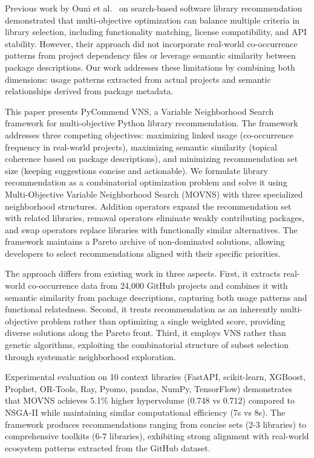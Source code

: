\documentclass[runningheads]{llncs}
\begin{document}
Previous work by Ouni et al.~\cite{ouni2017} on search-based software library recommendation demonstrated that multi-objective optimization can balance multiple criteria in library selection, including functionality matching, license compatibility, and API stability. However, their approach did not incorporate real-world co-occurrence patterns from project dependency files or leverage semantic similarity between package descriptions. Our work addresses these limitations by combining both dimensions: usage patterns extracted from actual projects and semantic relationships derived from package metadata.

This paper presents PyCommend VNS, a Variable Neighborhood Search framework for multi-objective Python library recommendation. The framework addresses three competing objectives: maximizing linked usage (co-occurrence frequency in real-world projects), maximizing semantic similarity (topical coherence based on package descriptions), and minimizing recommendation set size (keeping suggestions concise and actionable). We formulate library recommendation as a combinatorial optimization problem and solve it using Multi-Objective Variable Neighborhood Search (MOVNS) with three specialized neighborhood structures. Addition operators expand the recommendation set with related libraries, removal operators eliminate weakly contributing packages, and swap operators replace libraries with functionally similar alternatives. The framework maintains a Pareto archive of non-dominated solutions, allowing developers to select recommendations aligned with their specific priorities.

The approach differs from existing work in three aspects. First, it extracts real-world co-occurrence data from 24,000 GitHub projects and combines it with semantic similarity from package descriptions, capturing both usage patterns and functional relatedness. Second, it treats recommendation as an inherently multi-objective problem rather than optimizing a single weighted score, providing diverse solutions along the Pareto front. Third, it employs VNS rather than genetic algorithms, exploiting the combinatorial structure of subset selection through systematic neighborhood exploration.

Experimental evaluation on 10 context libraries (FastAPI, scikit-learn, XGBoost, Prophet, OR-Tools, Ray, Pyomo, pandas, NumPy, TensorFlow) demonstrates that MOVNS achieves 5.1\% higher hypervolume (0.748 vs 0.712) compared to NSGA-II while maintaining similar computational efficiency (7s vs 8s). The framework produces recommendations ranging from concise sets (2-3 libraries) to comprehensive toolkits (6-7 libraries), exhibiting strong alignment with real-world ecosystem patterns extracted from the GitHub dataset.
\end{document}
